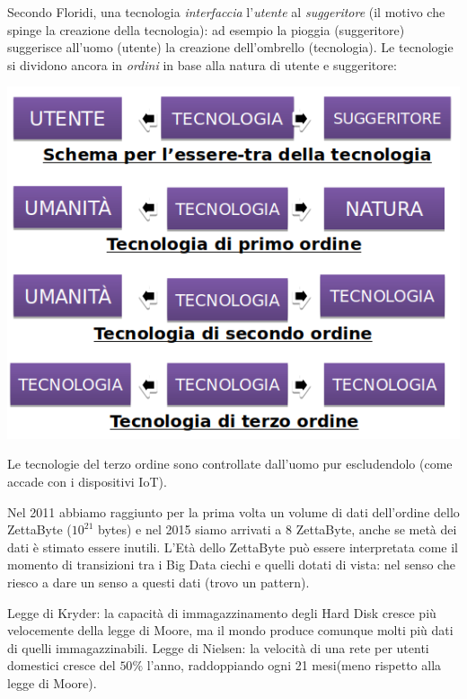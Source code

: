 \documentclass[a4page, 11pt]{article}
\begin{document}
Secondo Floridi, una tecnologia \textit{interfaccia} l'\textit{utente} al \textit{suggeritore} (il motivo che spinge la creazione della tecnologia): ad esempio la pioggia (suggeritore) suggerisce all'uomo (utente) la creazione dell'ombrello (tecnologia).
Le tecnologie si dividono ancora in \textit{ordini} in base alla natura di utente e suggeritore:
\begin{center}
  \includegraphics[scale=0.4]{image2.png}
\end{center}
Le tecnologie del terzo ordine sono controllate dall'uomo pur escludendolo (come accade con i dispositivi IoT). \newline

Nel 2011 abbiamo raggiunto per la prima volta un volume di dati dell'ordine dello ZettaByte ($10^{21}$ bytes) e nel 2015 siamo arrivati a $8$ ZettaByte, anche se metà dei dati è stimato essere inutili.
L'Età dello ZettaByte può essere interpretata come il momento di transizioni tra i Big Data ciechi e quelli dotati di vista: nel senso che riesco a dare un senso a questi dati (trovo un pattern).

Legge di Kryder: la capacità di immagazzinamento degli Hard Disk cresce più velocemente della legge di Moore, ma il mondo produce comunque molti più dati di quelli immagazzinabili. \newline
Legge di Nielsen: la velocità di una rete per utenti domestici cresce del $50\%$ l'anno, raddoppiando ogni 21 mesi(meno rispetto alla legge di Moore).
\end{document}
